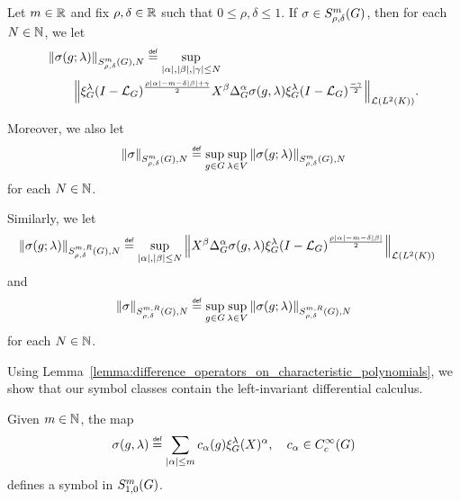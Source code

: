 \begin{definition}
\label{definition:symbol_semi-norms}
    Let $m \in \mathbb{R}$ and fix $\rho, \delta \in \mathbb{R}$ such that $0 \leq \rho, \delta \leq 1$.
    If $\sigma \in S^{m}_{\rho, \delta}(G)$,
    then for each $N \in \mathbb{N}$,
    we let
    \begin{align*}
        &\SymbolSemiNorm m {\rho, \delta} N {\sigma(g; \lambda)}
        \defeq
        \sup_{\abs \alpha, \abs \beta, \abs \gamma \leq N}
        \\
        &\qquad
        \norm [\Lin{\Lebesgue 2 \CompactGroup}] {%
            \Rep{\lambda} \BesselPotential{\rho \abs\alpha - m - \delta \abs\beta + \gamma} \LeftDifferentialOperator{\beta} \DifferenceOperatorOrder{\alpha} \sigma(g, \lambda) \Rep{\lambda} \BesselPotential{-\gamma}
        }.
    \end{align*}

    Moreover, we also let
    \begin{align*}
        \SymbolSemiNorm m {\rho, \delta} N \sigma
        \defeq \sup_{g \in \Group} \sup_{\lambda \in \VectorSpace}
        \SymbolSemiNorm m {\rho, \delta} N {\sigma(g; \lambda)}
    \end{align*}
    for each $N \in \mathbb{N}$.

    Similarly,
    we let
    \begin{align*}
        &\SymbolSemiNorm {m, R} {\rho, \delta} N {\sigma(g; \lambda)}
        \defeq
        \sup_{\abs \alpha, \abs \beta \leq N}
        \norm [\Lin{\Lebesgue 2 \CompactGroup}] {%
            \LeftDifferentialOperator{\beta} \DifferenceOperatorOrder{\alpha} \sigma(g, \lambda)
            \Rep{\lambda} \BesselPotential{\rho \abs\alpha - m - \delta \abs\beta}
        }
    \end{align*}
    and
    \begin{align*}
        \SymbolSemiNorm {m, R} {\rho, \delta} N \sigma
        \defeq \sup_{g \in \Group} \sup_{\lambda \in \VectorSpace}
        \SymbolSemiNorm {m, R} {\rho, \delta} N {\sigma(g; \lambda)}
    \end{align*}
    for each $N \in \mathbb{N}$.
\end{definition}

Using Lemma~\ref{lemma:difference_operators_on_characteristic_polynomials},
we show that our symbol classes contain the left-invariant differential calculus.

\begin{example}
    Given $m \in \mathbb{N}$,
    the map
    \begin{align*}
        \sigma(g, \lambda) \defeq \sum_{\abs \alpha \leq m} c_\alpha(g) \Rep \lambda(X)^\alpha,
        \quad c_\alpha \in C^\infty_c(\Group)
    \end{align*}
    defines a symbol in $S^{m}_{1, 0}(G)$.
\end{example}

